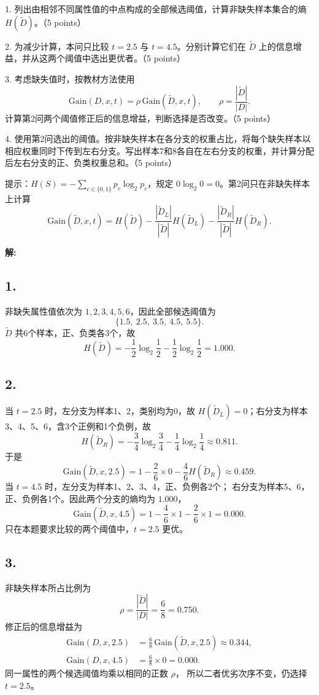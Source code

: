 \documentclass[10pt]{article}
\begin{document}
1. 列出由相邻不同属性值的中点构成的全部候选阈值，计算非缺失样本集合的熵 $H(\tilde D)$。（5 points）

2. 为减少计算，本问只比较 $t=2.5$ 与 $t=4.5$。分别计算它们在 $\tilde D$ 上的信息增益，并从这两个阈值中选出更优者。（5 points）

3. 考虑缺失值时，按教材方法使用
\[
\mathrm{Gain}(D,x,t)=\rho\,\mathrm{Gain}(\tilde D,x,t),
\qquad \rho=\frac{|\tilde D|}{|D|}.
\]
计算第2问两个阈值修正后的信息增益，判断选择是否改变。（5 points）

4. 使用第2问选出的阈值。按非缺失样本在各分支的权重占比，将每个缺失样本以相应权重同时下传到左右分支。写出样本7和8各自在左右分支的权重，并计算分配后左右分支的正、负类权重总和。（5 points）

\noindent 提示：$H(S)=-\sum_{c\in\{0,1\}}p_c\log_2p_c$，规定 $0\log_2 0=0$。第2问只在非缺失样本上计算
\[
\mathrm{Gain}(\tilde D,x,t)=H(\tilde D)
-\frac{|\tilde D_L|}{|\tilde D|}H(\tilde D_L)
-\frac{|\tilde D_R|}{|\tilde D|}H(\tilde D_R).
\]

\textbf{\large 解:}

\subsection*{1.}
非缺失属性值依次为 $1,2,3,4,5,6$，因此全部候选阈值为
\[
{\{1.5,\ 2.5,\ 3.5,\ 4.5,\ 5.5\}}.
\]
$\tilde D$ 共6个样本，正、负类各3个，故
\[
{H(\tilde D)=-\frac12\log_2\frac12-\frac12\log_2\frac12=1.000}.
\]

\subsection*{2.}
当 $t=2.5$ 时，左分支为样本1、2，类别均为0，故
$H(\tilde D_L)=0$；右分支为样本3、4、5、6，含3个正例和1个负例，故
\[
H(\tilde D_R)=-\frac34\log_2\frac34-\frac14\log_2\frac14
\approx0.811.
\]
于是
\[
\mathrm{Gain}(\tilde D,x,2.5)
=1-\frac26\times0-\frac46H(\tilde D_R)
\approx{0.459}.
\]
当 $t=4.5$ 时，左分支为样本1、2、3、4，正、负例各2个；
右分支为样本5、6，正、负例各1个。因此两个分支的熵均为 $1.000$，
\[
\mathrm{Gain}(\tilde D,x,4.5)
=1-\frac46\times1-\frac26\times1={0.000}.
\]
只在本题要求比较的两个阈值中，${t=2.5}$ 更优。

\subsection*{3.}
非缺失样本所占比例为
\[
\rho=\frac{|\tilde D|}{|D|}=\frac68=0.750.
\]
修正后的信息增益为
\begin{align*}
\mathrm{Gain}(D,x,2.5)
&=\frac68\,\mathrm{Gain}(\tilde D,x,2.5)\approx{0.344},\\
\mathrm{Gain}(D,x,4.5)
&=\frac68\times0={0.000}.
\end{align*}
同一属性的两个候选阈值均乘以相同的正数 $\rho$，
所以二者优劣次序不变，仍选择 $t=2.5$。
\end{document}
